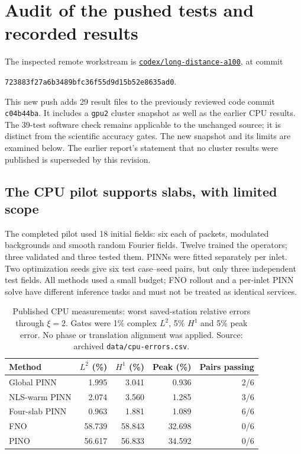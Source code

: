 \documentclass[11pt]{article}
\begin{document}
\section{Audit of the pushed tests and recorded results}
The inspected remote workstream is
\href{https://github.com/matasvai/dysthe-experiments/tree/codex/long-distance-a100}{\texttt{codex/long-distance-a100}},
at commit
\begin{center}\small\texttt{723883f27a6b3489bfc36f55d9d15b52e8635ad0}.\end{center}
This new push adds 29 result files to the previously reviewed code commit
\texttt{c04b44ba}. It includes a \texttt{gpu2} cluster snapshot as well as the
earlier CPU results. The 39-test software check remains applicable to the
unchanged source; it is distinct from the scientific accuracy gates. The new
snapshot and its limits are examined below. The earlier report's statement
that no cluster results were published is superseded by this revision.

\subsection{The CPU pilot supports slabs, with limited scope}
The completed pilot used 18 initial fields: six each of packets, modulated
backgrounds and smooth random Fourier fields. Twelve trained the operators;
three validated and three tested them. PINNs were fitted separately per inlet.
Two optimization seeds give six test case--seed pairs, but only three independent
test fields. All methods used a small budget; FNO rollout and a per-inlet PINN
solve have different inference tasks and must not be treated as identical services.

\begin{table}[h]\centering\small
\begin{tabular}{lrrrr}\toprule
Method & $L^2$ (\%) & $H^1$ (\%) & Peak (\%) & Pairs passing\\\midrule
Global PINN & 1.995 & 3.041 & 0.936 & 2/6\\
NLS-warm PINN & 2.074 & 3.560 & 1.285 & 3/6\\
Four-slab PINN & 0.963 & 1.881 & 1.089 & 6/6\\
FNO & 58.739 & 58.843 & 32.698 & 0/6\\
PINO & 56.617 & 56.833 & 34.592 & 0/6\\\bottomrule
\end{tabular}
\caption{Published CPU measurements: worst saved-station relative errors through
$\xi=2$. Gates were 1\% complex $L^2$, 5\% $H^1$ and 5\% peak error.
No phase or translation alignment was applied. Source: archived
\texttt{data/cpu-errors.csv}.}
\end{table}
\end{document}
